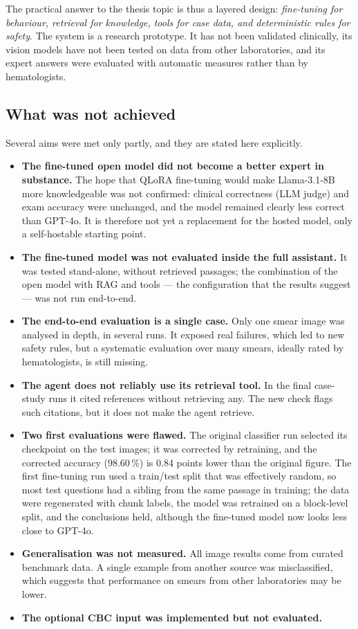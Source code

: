 The practical answer to the thesis topic is thus a layered design: \emph{fine-tuning for behaviour, retrieval for knowledge, tools for case data, and deterministic rules for safety}. The system is a research prototype. It has not been validated clinically, its vision models have not been tested on data from other laboratories, and its expert answers were evaluated with automatic measures rather than by hematologists.

\subsection{What was not achieved}

Several aims were met only partly, and they are stated here explicitly.

\begin{itemize}
  \item \textbf{The fine-tuned open model did not become a better expert in substance.} The hope that QLoRA fine-tuning would make Llama-3.1-8B more knowledgeable was not confirmed: clinical correctness (LLM judge) and exam accuracy were unchanged, and the model remained clearly less correct than GPT-4o. It is therefore not yet a replacement for the hosted model, only a self-hostable starting point.
  \item \textbf{The fine-tuned model was not evaluated inside the full assistant.} It was tested stand-alone, without retrieved passages; the combination of the open model with RAG and tools --- the configuration that the results suggest --- was not run end-to-end.
  \item \textbf{The end-to-end evaluation is a single case.} Only one smear image was analysed in depth, in several runs. It exposed real failures, which led to new safety rules, but a systematic evaluation over many smears, ideally rated by hematologists, is still missing.
  \item \textbf{The agent does not reliably use its retrieval tool.} In the final case-study runs it cited references without retrieving any. The new check flags such citations, but it does not make the agent retrieve.
  \item \textbf{Two first evaluations were flawed.} The original classifier run selected its checkpoint on the test images; it was corrected by retraining, and the corrected accuracy (98.60\,\%) is 0.84 points lower than the original figure. The first fine-tuning run used a train/test split that was effectively random, so most test questions had a sibling from the same passage in training; the data were regenerated with chunk labels, the model was retrained on a block-level split, and the conclusions held, although the fine-tuned model now looks less close to GPT-4o.
  \item \textbf{Generalisation was not measured.} All image results come from curated benchmark data. A single example from another source was misclassified, which suggests that performance on smears from other laboratories may be lower.
  \item \textbf{The optional CBC input was implemented but not evaluated.}
\end{itemize}

